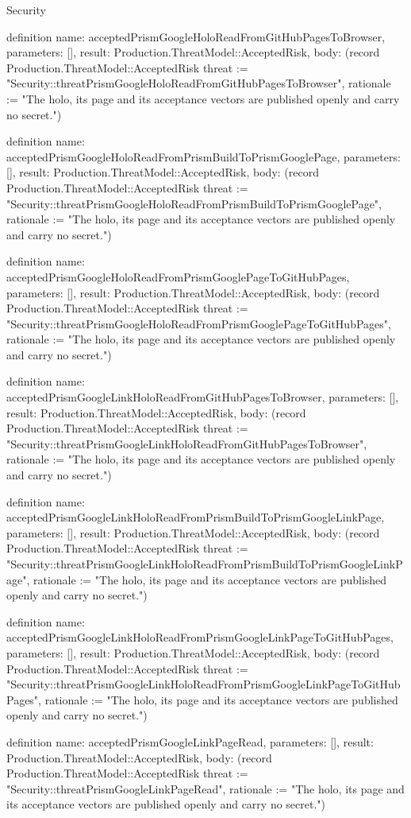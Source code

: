 \begin{lexlean}{Security}
\begin{semanticmodule}
definition{
  name: acceptedPrismGoogleHoloReadFromGitHubPagesToBrowser,
  parameters: [],
  result: Production.ThreatModel::AcceptedRisk,
  body: (record Production.ThreatModel::AcceptedRisk {threat := "Security::threatPrismGoogleHoloReadFromGitHubPagesToBrowser", rationale := "The holo, its page and its acceptance vectors are published openly and carry no secret."})
}

definition{
  name: acceptedPrismGoogleHoloReadFromPrismBuildToPrismGooglePage,
  parameters: [],
  result: Production.ThreatModel::AcceptedRisk,
  body: (record Production.ThreatModel::AcceptedRisk {threat := "Security::threatPrismGoogleHoloReadFromPrismBuildToPrismGooglePage", rationale := "The holo, its page and its acceptance vectors are published openly and carry no secret."})
}

definition{
  name: acceptedPrismGoogleHoloReadFromPrismGooglePageToGitHubPages,
  parameters: [],
  result: Production.ThreatModel::AcceptedRisk,
  body: (record Production.ThreatModel::AcceptedRisk {threat := "Security::threatPrismGoogleHoloReadFromPrismGooglePageToGitHubPages", rationale := "The holo, its page and its acceptance vectors are published openly and carry no secret."})
}

definition{
  name: acceptedPrismGoogleLinkHoloReadFromGitHubPagesToBrowser,
  parameters: [],
  result: Production.ThreatModel::AcceptedRisk,
  body: (record Production.ThreatModel::AcceptedRisk {threat := "Security::threatPrismGoogleLinkHoloReadFromGitHubPagesToBrowser", rationale := "The holo, its page and its acceptance vectors are published openly and carry no secret."})
}

definition{
  name: acceptedPrismGoogleLinkHoloReadFromPrismBuildToPrismGoogleLinkPage,
  parameters: [],
  result: Production.ThreatModel::AcceptedRisk,
  body: (record Production.ThreatModel::AcceptedRisk {threat := "Security::threatPrismGoogleLinkHoloReadFromPrismBuildToPrismGoogleLinkPage", rationale := "The holo, its page and its acceptance vectors are published openly and carry no secret."})
}

definition{
  name: acceptedPrismGoogleLinkHoloReadFromPrismGoogleLinkPageToGitHubPages,
  parameters: [],
  result: Production.ThreatModel::AcceptedRisk,
  body: (record Production.ThreatModel::AcceptedRisk {threat := "Security::threatPrismGoogleLinkHoloReadFromPrismGoogleLinkPageToGitHubPages", rationale := "The holo, its page and its acceptance vectors are published openly and carry no secret."})
}

definition{
  name: acceptedPrismGoogleLinkPageRead,
  parameters: [],
  result: Production.ThreatModel::AcceptedRisk,
  body: (record Production.ThreatModel::AcceptedRisk {threat := "Security::threatPrismGoogleLinkPageRead", rationale := "The holo, its page and its acceptance vectors are published openly and carry no secret."})
}


\end{semanticmodule}
\end{lexlean}
